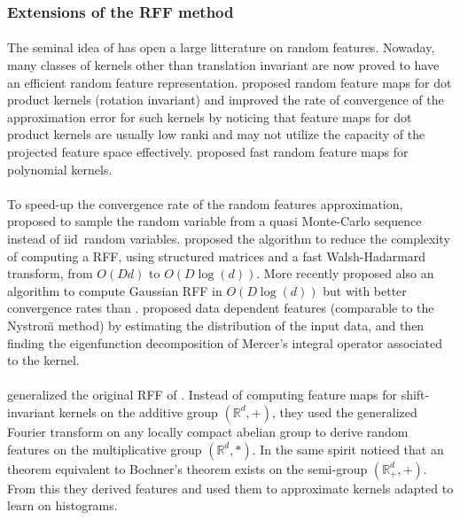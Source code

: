 \begin{Proposition}
\subsubsection{Extensions of the RFF method}
\paragraph{}
The seminal idea of \citet{Rahimi2007} has open a large litterature on random
features. Nowaday, many classes of kernels other than translation invariant are
now proved to have an efficient random feature representation.
\citet{kar2012random} proposed random feature maps for dot product kernels
(rotation invariant) and \citet{hamid2014compact} improved the rate of
convergence of the approximation error for such kernels by noticing that
feature maps for dot product kernels are usually low ranki and may not utilize
the capacity of the projected feature  space  effectively. 
proposed fast random feature maps for polynomial kernels.
\paragraph{}
To speed-up the convergence rate of the random features approximation,
\citet{yang2014quasi} proposed to sample the random variable from a quasi
Monte-Carlo sequence instead of \acs{iid}~random variables. 
proposed the  algorithm to reduce the complexity of computing a
\acs{RFF}, using structured matrices and a fast Walsh-Hadarmard transform, from
$O(Dd)$ to $O(D\log(d))$. More recently \citet{felix2016orthogonal} proposed
also an algorithm  to compute Gaussian \acs{RFF} in $O(D\log(d))$ but
with better convergence rates than  \citep{Le2013}.
 proposed data dependent features (comparable to the
Nystro\"m method) by estimating the distribution of the input data, and then
finding the eigenfunction decomposition of Mercer's integral operator
associated to the kernel.
\paragraph{}
 generalized the original \acs{RFF} of \citet{Rahimi2007}.
Instead of computing feature maps for shift-invariant kernels on the additive
group $(\mathbb{R}^d, +)$, they used the generalized Fourier transform on any
locally compact abelian group to derive random features on the multiplicative
group $(\mathbb{R}^d, *)$. In the same spirit \citet{yang2014random} noticed
that an theorem equivalent to Bochner's theorem exists on the semi-group
$(\mathbb{R}_+^d, +)$. From this they derived  features and
used them to approximate kernels adapted to learn on histograms.

\end{Proposition}
